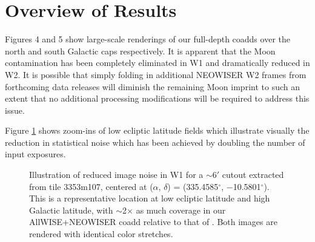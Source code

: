 \documentclass{emulateapj}
\begin{document}
\section{Overview of Results}
\label{sec:results}

Figures 4 and 5 show large-scale renderings of our full-depth coadds 
over the north and south Galactic caps respectively. It is 
apparent that the Moon contamination has been completely eliminated in
W1 and dramatically reduced in W2. It is possible that simply folding in 
additional NEOWISER W2 frames from forthcoming data releases will diminish the 
remaining Moon imprint to such an extent that no additional processing 
modifications will be required to address this issue.

\begin{figure*} [ht]
 \begin{center}
  \caption{\label{fig:w2_large} A large portion of the south Galactic
           cap near the ecliptic plane is shown in W2. Top: \cite{lang14}
           unWISE coadds based on the AllWISE release imaging and without
           rejection of Moon-contaminated frames. Bottom: same region of
           sky in our new AllWISE+NEOWISER stacks, with double the
           redundancy in sky coverage and rejection/recovery of 
           Moon-contaminated frames.}
 \end{center}
\end{figure*}

Figure \ref{fig:image_noise} shows zoom-ins of low ecliptic latitude fields 
which illustrate visually the reduction in statistical noise which has been 
achieved by doubling the number of input exposures.


\begin{figure}[ht]
 \begin{center}
  \caption{\label{fig:image_noise} Illustration of reduced image noise
           in W1 for a $\sim$6$'$ cutout extracted from tile 3353m107, centered
           at ($\alpha$, $\delta$) = (335.4585$^{\circ}$, $-$10.5801$^{\circ}$). 
           This is a representative location at low ecliptic latitude and high 
           Galactic latitude,  with $\sim$2$\times$ as much coverage in our 
           AllWISE+NEOWISER coadd relative to that of \cite{lang14}. Both
           images are rendered with identical color stretches.}
 \end{center}
\end{figure}
\end{document}
